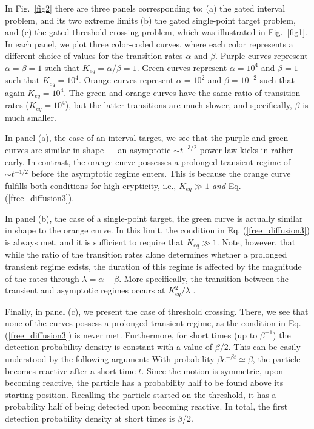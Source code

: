 In Fig.~\ref{fig2} there are three panels corresponding to: %
(a) the gated interval problem, and its two extreme limits (b) the gated single-point target problem, and (c) the gated threshold crossing problem, which was illustrated in Fig.~\ref{fig1}. In each panel, we plot three color-coded curves, where each color represents a different choice of values for the transition rates $\alpha$ and $\beta$. Purple curves represent $\alpha=\beta=1$ such that $K_{eq}=\alpha/\beta=1$. Green curves represent $\alpha=10^4$ and $\beta=1$ such that $K_{eq}=10^4$. Orange curves represent $\alpha=10^2$ and $\beta=10^{-2}$ such that again $K_{eq}=10^4$. The green and orange curves have the same ratio of transition rates ($K_{eq}=10^4$), but the latter transitions are much slower, and specifically, $\beta$ is much smaller. 

In panel (a), the case of an interval target, we see that the purple and green curves are similar in shape --- an asymptotic $\sim t^{-3/2}$ power-law kicks in rather early. In contrast, the orange curve possesses a prolonged transient regime of $\sim t^{-1/2}$ before the asymptotic regime enters. This is because the orange curve fulfills both conditions for high-crypticity, i.e., $K_{eq} \gg 1$ \textit{and} Eq. (\ref{free_diffusion3}). 

In panel (b), the case of a single-point target, the green curve is actually similar in shape to the orange curve. In this limit, the condition in Eq. (\ref{free_diffusion3}) is always met, and it is sufficient to require that $K_{eq} \gg 1$. Note, however, that while the ratio of the transition rates alone determines whether a prolonged transient regime exists, the duration of this regime is affected by the magnitude of the rates through $\lambda=\alpha+\beta$. More specifically, the transition between the transient and asymptotic regimes occurs at $K_{eq}^2/\lambda$ \cite{mercado2019first}.

Finally, in panel (c), we present the case of threshold crossing. There, we see that none of the curves possess a prolonged transient regime, as the condition in Eq. (\ref{free_diffusion3}) is never met. Furthermore, for short times (up to $\beta^{-1}$) the detection probability density is constant with a value of $\beta/2$. This can be easily understood by the following argument: With probability $\beta e^{- \beta t} \simeq \beta$, the particle becomes reactive after a short time $t$. Since the motion is symmetric, upon becoming reactive, the particle has a probability half to be found above its starting position. Recalling the particle started on the threshold, it has a probability half of being detected upon becoming reactive. In total, the first detection probability density at short times is $\beta/2$.


